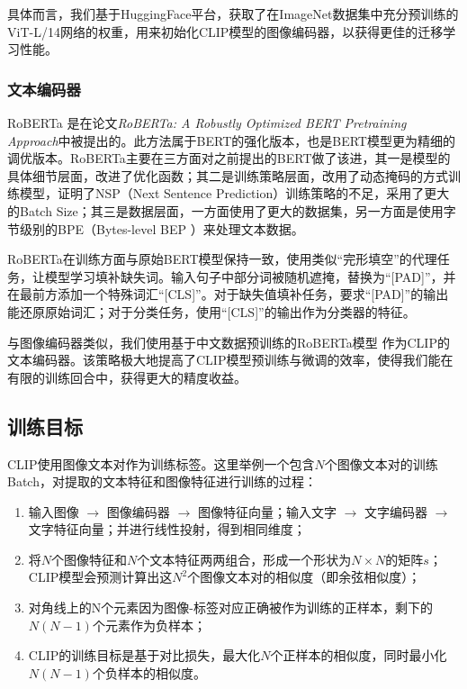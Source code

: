 \documentclass[a4paper]{zreport}
\begin{document}
具体而言，我们基于HuggingFace平台，获取了在ImageNet数据集中充分预训练的ViT-L/14网络的权重，用来初始化CLIP模型的图像编码器，以获得更佳的迁移学习性能。


\subsubsection{文本编码器}

RoBERTa \cite{roberta} 是在论文\emph{RoBERTa: A Robustly Optimized BERT Pretraining Approach}中被提出的。此方法属于BERT的强化版本，也是BERT模型更为精细的调优版本。RoBERTa主要在三方面对之前提出的BERT做了该进，其一是模型的具体细节层面，改进了优化函数；其二是训练策略层面，改用了动态掩码的方式训练模型，证明了NSP（Next Sentence Prediction）训练策略的不足，采用了更大的Batch Size；其三是数据层面，一方面使用了更大的数据集，另一方面是使用字节级别的BPE（Bytes-level BEP ）来处理文本数据。

RoBERTa在训练方面与原始BERT模型保持一致，使用类似“完形填空”的代理任务，让模型学习填补缺失词。输入句子中部分词被随机遮掩，替换为“[PAD]”，并在最前方添加一个特殊词汇“[CLS]”。对于缺失值填补任务，要求“[PAD]”的输出能还原原始词汇；对于分类任务，使用“[CLS]”的输出作为分类器的特征。

与图像编码器类似，我们使用基于中文数据预训练的RoBERTa模型 \cite{cn-roberta} 作为CLIP的文本编码器。该策略极大地提高了CLIP模型预训练与微调的效率，使得我们能在有限的训练回合中，获得更大的精度收益。


\subsection{训练目标}

CLIP使用图像文本对作为训练标签。这里举例一个包含$N$个图像文本对的训练Batch，对提取的文本特征和图像特征进行训练的过程：

\begin{enumerate}
\item 输入图像 $\rightarrow$ 图像编码器 $\rightarrow$ 图像特征向量；输入文字 $\rightarrow$ 文字编码器 $\rightarrow$ 文字特征向量；并进行线性投射，得到相同维度；
\item 将$N$个图像特征和$N$个文本特征两两组合，形成一个形状为$N \times N$的矩阵$s$；
CLIP模型会预测计算出这$N^2$个图像文本对的相似度（即余弦相似度）；
\item 对角线上的N个元素因为图像-标签对应正确被作为训练的正样本，剩下的$N(N-1)$个元素作为负样本；
\item CLIP的训练目标是基于对比损失，最大化$N$个正样本的相似度，同时最小化$N(N-1)$个负样本的相似度。
\end{enumerate}
\end{document}

